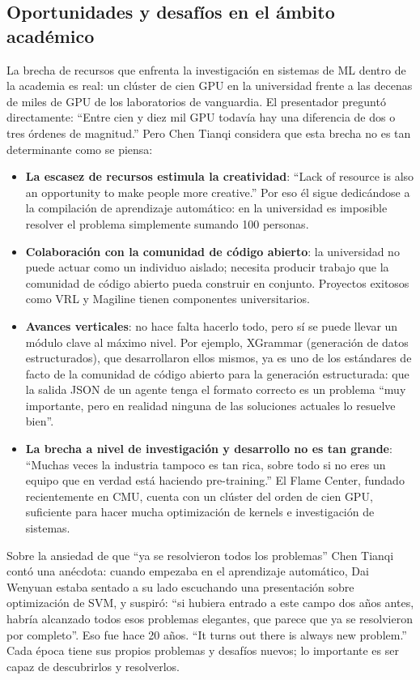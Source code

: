 \subsection{Oportunidades y desafíos en el ámbito académico}

La brecha de recursos que enfrenta la investigación en sistemas de ML dentro de la academia es real: un clúster de cien GPU en la universidad frente a las decenas de miles de GPU de los laboratorios de vanguardia. El presentador preguntó directamente: ``Entre cien y diez mil GPU todavía hay una diferencia de dos o tres órdenes de magnitud.'' Pero Chen Tianqi considera que esta brecha no es tan determinante como se piensa:

\begin{itemize}
    \item \textbf{La escasez de recursos estimula la creatividad}: ``Lack of resource is also an opportunity to make people more creative.'' Por eso él sigue dedicándose a la compilación de aprendizaje automático: en la universidad es imposible resolver el problema simplemente sumando 100 personas.
    \item \textbf{Colaboración con la comunidad de código abierto}: la universidad no puede actuar como un individuo aislado; necesita producir trabajo que la comunidad de código abierto pueda construir en conjunto. Proyectos exitosos como VRL y Magiline tienen componentes universitarios.
    \item \textbf{Avances verticales}: no hace falta hacerlo todo, pero sí se puede llevar un módulo clave al máximo nivel. Por ejemplo, XGrammar (generación de datos estructurados), que desarrollaron ellos mismos, ya es uno de los estándares de facto de la comunidad de código abierto para la generación estructurada: que la salida JSON de un agente tenga el formato correcto es un problema ``muy importante, pero en realidad ninguna de las soluciones actuales lo resuelve bien''.
    \item \textbf{La brecha a nivel de investigación y desarrollo no es tan grande}: ``Muchas veces la industria tampoco es tan rica, sobre todo si no eres un equipo que en verdad está haciendo pre-training.'' El Flame Center, fundado recientemente en CMU, cuenta con un clúster del orden de cien GPU, suficiente para hacer mucha optimización de kernels e investigación de sistemas.
\end{itemize}

\begin{warningbox}{Sobre la ansiedad de que ``ya se resolvieron todos los problemas''}
Chen Tianqi contó una anécdota: cuando empezaba en el aprendizaje automático, Dai Wenyuan estaba sentado a su lado escuchando una presentación sobre optimización de SVM, y suspiró: ``si hubiera entrado a este campo dos años antes, habría alcanzado todos esos problemas elegantes, que parece que ya se resolvieron por completo''. Eso fue hace 20 años. ``It turns out there is always new problem.'' Cada época tiene sus propios problemas y desafíos nuevos; lo importante es ser capaz de descubrirlos y resolverlos.
\end{warningbox}

